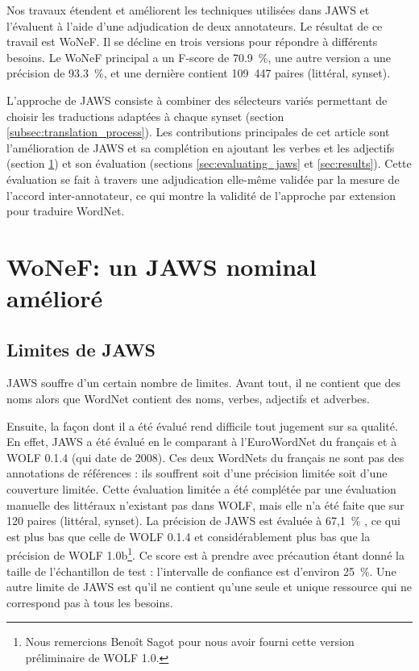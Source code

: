Nos travaux étendent et améliorent les techniques utilisées dans JAWS et
l'évaluent à l'aide d'une adjudication de deux annotateurs. Le résultat de ce
travail est WoNeF. Il se décline en trois versions pour répondre à différents
besoins. Le WoNeF principal a un F-score de 70.9~\%, une autre version a une
précision de 93.3~\%, et une dernière contient 109~447 paires (littéral,
synset).

L'approche de JAWS consiste à combiner des sélecteurs variés permettant de
choisir les traductions adaptées à chaque synset (section
\ref{subsec:translation_process}). Les contributions principales de cet article
sont l'amélioration de JAWS et sa complétion en ajoutant les verbes et les
adjectifs (section \ref{sec:improving_jaws}) et son évaluation (sections
\ref{sec:evaluating_jaws} et \ref{sec:results}). Cette évaluation se fait à
travers une adjudication elle-même validée par la mesure de l'accord
inter-annotateur, ce qui montre la validité de l'approche par extension pour
traduire WordNet.

\section{WoNeF: un JAWS nominal amélioré}
\label{sec:improving_jaws}

\subsection{Limites de JAWS}
\label{subsec:limitations}

JAWS souffre d'un certain nombre de limites. Avant tout, il ne contient que des
noms alors que WordNet contient des noms, verbes, adjectifs et adverbes.

Ensuite, la façon dont il a été évalué rend difficile tout jugement sur sa
qualité. En effet, JAWS a été évalué en le comparant à l'EuroWordNet du
français et à WOLF 0.1.4 (qui date de 2008). Ces deux WordNets du français ne
sont pas des annotations de références : ils souffrent soit d'une précision
limitée soit d'une couverture limitée. Cette évaluation limitée a été complétée
par une évaluation manuelle des littéraux n'existant pas dans WOLF, mais elle
n'a été faite que sur 120 paires (littéral, synset). La précision de JAWS est
évaluée à 67,1~\% \citep{mouton2010phd}, ce qui est plus bas que celle de WOLF
0.1.4 et considérablement plus bas que la précision de WOLF 1.0b\footnote{Nous
remercions Benoît Sagot pour nous avoir fourni cette version préliminaire de
WOLF 1.0.}. Ce score est à prendre avec précaution étant donné la taille de
l'échantillon de test : l'intervalle de confiance est d'environ 25~\%. Une
autre limite de JAWS est qu'il ne contient qu'une seule et unique ressource qui
ne correspond pas à tous les besoins.

